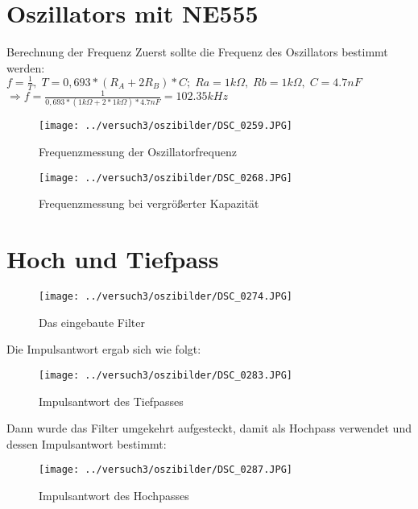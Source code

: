 \documentclass[]{beamer} %
\begin{document}
	\section{Oszillators mit NE555}
	\begin{frame}{Berechnung der Frequenz}
		Zuerst sollte die Frequenz des Oszillators bestimmt werden:\\
		$ f=\frac{1}{T},\; T = 0,693 * (R_A + 2 R_B) * C;\; Ra = 1kΩ,\; Rb = 1kΩ,\; C = 4.7nF$\\
		$\Rightarrow f=\frac{1}{0,693 * (1kΩ + 2*1kΩ) * 4.7nF} = 102.35 kHz$\\
	\end{frame}

	\begin{frame}
		\begin{figure}[H]
			\centering
			\texttt{[image: ../versuch3/oszibilder/DSC\_0259.JPG]}
			\caption{Frequenzmessung der Oszillatorfrequenz}
		\end{figure}
	\end{frame}

	\begin{frame}
		\begin{figure}[H]
			\centering
			\texttt{[image: ../versuch3/oszibilder/DSC\_0268.JPG]}
			\caption{Frequenzmessung bei vergrößerter Kapazität}
		\end{figure}
	\end{frame}

	\section{Hoch und Tiefpass}

	\begin{frame}
		\begin{figure}
			\centering
			\texttt{[image: ../versuch3/oszibilder/DSC\_0274.JPG]}
			\caption{Das eingebaute Filter}
		\end{figure}
	\end{frame}

	\begin{frame}
		Die Impulsantwort ergab sich wie folgt:
		\begin{figure}[H]
			\centering
			\texttt{[image: ../versuch3/oszibilder/DSC\_0283.JPG]}
			\caption{Impulsantwort des Tiefpasses}
		\end{figure}
	\end{frame}

	\begin{frame}
		Dann wurde das Filter umgekehrt aufgesteckt, damit als Hochpass verwendet und dessen Impulsantwort bestimmt:
		\begin{figure}[H]
			\centering
			\texttt{[image: ../versuch3/oszibilder/DSC\_0287.JPG]}
			\caption{Impulsantwort des Hochpasses}
		\end{figure}
	\end{frame}
\end{document}
